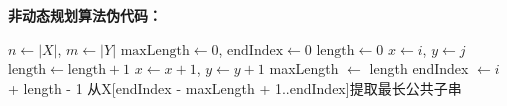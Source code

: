 \documentclass[UTF8,12pt,a4paper]{ctexart}
\begin{document}
\begin{enumerate}[1.]
	\textbf{非动态规划算法伪代码：}
	\begin{algorithm}[H]%
		\caption{LCS-NOT-DP($X, Y$)}
		\begin{algorithmic}[1]
			\State $n \gets |X|$, $m \gets |Y|$
			\State $\text{maxLength} \gets 0$, $\text{endIndex} \gets 0$
			 
				 
					\State $\text{length} \gets 0$
					\State $x \gets i$, $y \gets j$
						\State $\text{length} \gets \text{length} + 1$
						\State $x \gets x + 1$, $y \gets y + 1$
					\EndWhile
						\State maxLength $\gets$ length
						\State endIndex $\gets i$ + length - 1
					\EndIf
				\EndFor
			\EndFor
			\State 从X[endIndex - maxLength + 1..endIndex]提取最长公共子串
			\State {}
		\end{algorithmic}
	\end{algorithm}

	


\end{enumerate}
\end{document}

